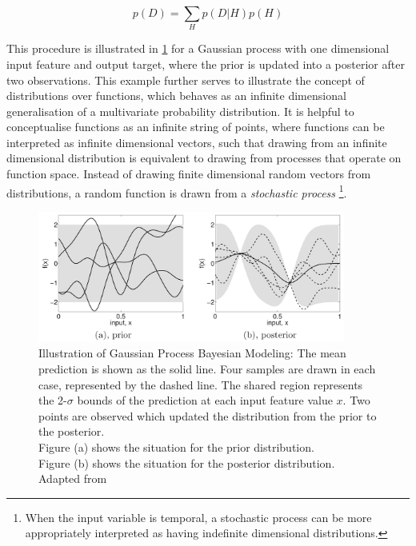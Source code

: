 			\begin{equation}
				p(D) = \sum_{H} p(D | H) p(H)
			\label{Equation:MarginalLikelihood}
			\end{equation}			
			
			This procedure is illustrated in \cref{Figure:BayesianModeling} for a Gaussian process with one dimensional input feature and output target, where the prior is updated into a posterior after two observations. This example further serves to illustrate the concept of distributions over functions, which behaves as an infinite dimensional generalisation of a multivariate probability distribution. It is helpful to conceptualise functions as an infinite string of points, where functions can be interpreted as infinite dimensional vectors, such that drawing from an infinite dimensional distribution is equivalent to drawing from processes that operate on function space. Instead of drawing finite dimensional random vectors from distributions, a random function is drawn from a \textit{stochastic process} \footnote{When the input variable is temporal, a stochastic process can be more appropriately interpreted as having indefinite dimensional distributions.}.
			
			\begin{figure}[!htbp]
				\centering
					\includegraphics[width=0.9\textwidth]{Figures/bayesianmodeling.png}
				\caption{Illustration of Gaussian Process Bayesian Modeling: The mean prediction is shown as the solid line. Four samples are drawn in each case, represented by the dashed line. The shared region represents the 2-$\sigma$ bounds of the prediction at each input feature value $x$. Two points are observed which updated the distribution from the prior to the posterior.\\
				Figure (a) shows the situation for the prior distribution.\\
				Figure (b) shows the situation for the posterior distribution. \\
				Adapted from \cite{GaussianProcessForMachineLearning}}
				\label{Figure:BayesianModeling}
			\end{figure}
			
